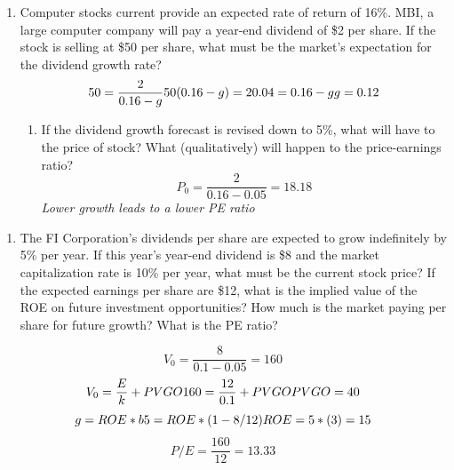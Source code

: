 \documentclass[11pt]{article}
\theoremstyle{definition}
\begin{document}
\begin{shaded}

    \begin{enumerate}
        \item Computer stocks current provide an expected rate of return 
        of 16\%.   MBI, a large computer company will pay a year-end dividend of \$2 
        per share.   If the stock is selling at \$50 per share, what must be the market's 
        expectation for the dividend growth rate?
        \[
        50 = \frac{2}{0.16-g}\\
        50(0.16-g) = 2\\
        0.04 = 0.16-g \\
        g = 0.12
        \]
        \begin{enumerate}
        \item[a. ] If the dividend growth forecast is revised down to 5\%, what will have to the price of stock?  What (qualitatively) will happen to the price-earnings ratio?
        \[ P_0 = \frac{2}{0.16-0.05} = 18.18\]
        \textit{Lower growth leads to a lower PE ratio}
        \end{enumerate}
    \end{enumerate}

\end{shaded}

\begin{shaded}

    \begin{enumerate}
        \item The FI Corporation's dividends per share are expected to 
        grow indefinitely by 5\% per year.  If this year's year-end dividend is \$8 and the market capitalization rate is 10\% per year, what must be the current stock price? If the expected earnings per share are \$12, what is the implied value of the ROE on future investment opportunities?   How much is the market paying per share for future growth?   What is the PE ratio?
    \end{enumerate}

    \[
    V_0 = \frac{8}{0.1-0.05} = 160
    \]
    \[
    V_0 = \frac{E}{k} + PVGO \\
    160 = \frac{12}{0.1} + PVGO \\
    PVGO = 40
    \]
    \[
    g = ROE*b \\
    5 = ROE * (1 - 8/12) \\
    ROE = 5 * (3) = 15
    \]
    \[
    P/E = \frac{160}{12} = 13.33
    \]

\end{shaded}
\end{document}
